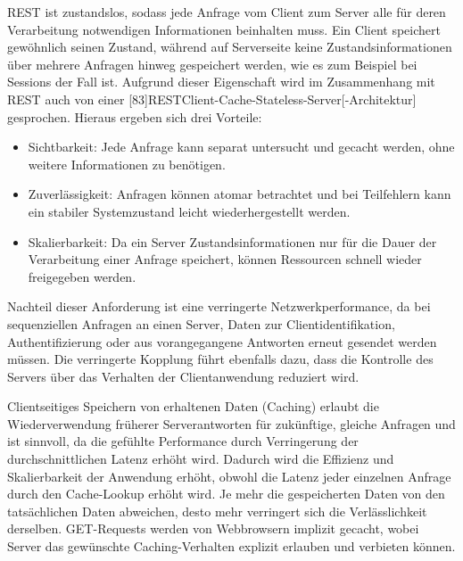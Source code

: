 \par
REST ist zustandslos, sodass jede Anfrage vom Client zum Server alle für deren Verarbeitung notwendigen Informationen beinhalten muss.
Ein Client speichert gewöhnlich seinen Zustand, während auf Serverseite keine Zustandsinformationen über mehrere Anfragen hinweg gespeichert werden, wie es zum Beispiel bei Sessions der Fall ist.
Aufgrund dieser Eigenschaft wird im Zusammenhang mit REST auch von einer [83]{REST}{Client-Cache-Stateless-Server[-Architektur]} gesprochen.
Hieraus ergeben sich drei Vorteile:\cite[vgl.][79]{REST}
\begin{itemize}
  \item Sichtbarkeit:
  Jede Anfrage kann separat untersucht und gecacht werden, ohne weitere Informationen zu benötigen.
  \item Zuverlässigkeit:
  Anfragen können atomar betrachtet und bei Teilfehlern kann ein stabiler Systemzustand leicht wiederhergestellt werden.
  \item Skalierbarkeit:
  Da ein Server Zustandsinformationen nur für die Dauer der Verarbeitung einer Anfrage speichert, können Ressourcen schnell wieder freigegeben werden.
\end{itemize}
Nachteil dieser Anforderung ist eine verringerte Netzwerkperformance, da bei sequenziellen Anfragen an einen Server, Daten zur Clientidentifikation, Authentifizierung oder aus vorangegangene Antworten erneut gesendet werden müssen.
Die verringerte Kopplung führt ebenfalls dazu, dass die Kontrolle des Servers über das Verhalten der Clientanwendung reduziert wird.
\par
Clientseitiges Speichern von erhaltenen Daten (Caching) erlaubt die Wiederverwendung früherer Serverantworten für zukünftige, gleiche Anfragen und ist sinnvoll, da die gefühlte Performance durch Verringerung der durchschnittlichen Latenz erhöht wird.
Dadurch wird die Effizienz und Skalierbarkeit der Anwendung erhöht, obwohl die Latenz jeder einzelnen Anfrage durch den Cache-Lookup erhöht wird.
Je mehr die gespeicherten Daten von den tatsächlichen Daten abweichen, desto mehr verringert sich die Verlässlichkeit derselben.\cite[vgl.][80]{REST}
GET-Requests werden von Webbrowsern implizit gecacht, wobei Server das gewünschte Caching-Verhalten explizit erlauben und verbieten können.

